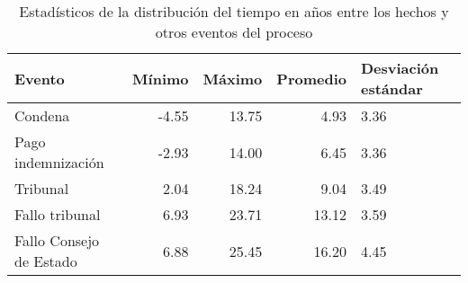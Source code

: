 \begin{table}[htbp]
\centering
\caption{Estadísticos de la distribución del
tiempo en años entre los hechos y otros eventos del proceso} 
\label{tab:hechos-evento}
\begin{tabular}{lrrrR{2cm}}
  \hline
Evento & Mínimo & Máximo & Promedio & Desviación estándar \\ 
  \hline
Condena & -4.55 & 13.75 & 4.93 & 3.36 \\ 
  Pago indemnización & -2.93 & 14.00 & 6.45 & 3.36 \\ 
  Tribunal & 2.04 & 18.24 & 9.04 & 3.49 \\ 
  Fallo tribunal & 6.93 & 23.71 & 13.12 & 3.59 \\ 
  Fallo Consejo de Estado & 6.88 & 25.45 & 16.20 & 4.45 \\ 
   \hline
\end{tabular}
\end{table}
